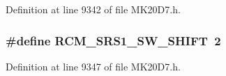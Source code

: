 Definition at line 9342 of file M\+K20\+D7.\+h.

\subsubsection[{\texorpdfstring{R\+C\+M\+\_\+\+S\+R\+S1\+\_\+\+S\+W\+\_\+\+S\+H\+I\+FT}{RCM_SRS1_SW_SHIFT}}]{\setlength{\rightskip}{0pt plus 5cm}\#define R\+C\+M\+\_\+\+S\+R\+S1\+\_\+\+S\+W\+\_\+\+S\+H\+I\+FT~2}\hypertarget{group___r_c_m___register___masks_ga7e554c1ae96dae684fbc81204283f86c}{}\label{group___r_c_m___register___masks_ga7e554c1ae96dae684fbc81204283f86c}


Definition at line 9347 of file M\+K20\+D7.\+h.

